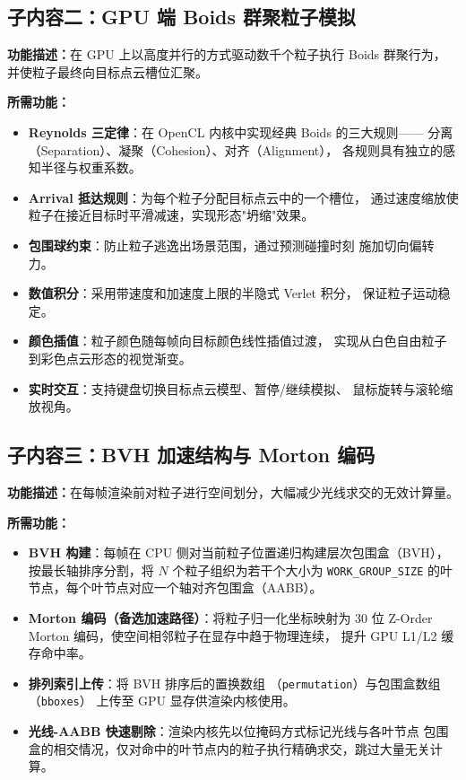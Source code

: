 \subsection{子内容二：GPU 端 Boids 群聚粒子模拟}

\textbf{功能描述：}在 GPU 上以高度并行的方式驱动数千个粒子执行 Boids 群聚行为，
并使粒子最终向目标点云槽位汇聚。

\textbf{所需功能：}
\begin{itemize}
  \item \textbf{Reynolds 三定律}：在 OpenCL 内核中实现经典 Boids 的三大规则——
        分离（Separation）、凝聚（Cohesion）、对齐（Alignment），
        各规则具有独立的感知半径与权重系数。
  \item \textbf{Arrival 抵达规则}：为每个粒子分配目标点云中的一个槽位，
        通过速度缩放使粒子在接近目标时平滑减速，实现形态"坍缩"效果。
  \item \textbf{包围球约束}：防止粒子逃逸出场景范围，通过预测碰撞时刻
        施加切向偏转力。
  \item \textbf{数值积分}：采用带速度和加速度上限的半隐式 Verlet 积分，
        保证粒子运动稳定。
  \item \textbf{颜色插值}：粒子颜色随每帧向目标颜色线性插值过渡，
        实现从白色自由粒子到彩色点云形态的视觉渐变。
  \item \textbf{实时交互}：支持键盘切换目标点云模型、暂停/继续模拟、
        鼠标旋转与滚轮缩放视角。
\end{itemize}

\subsection{子内容三：BVH 加速结构与 Morton 编码}

\textbf{功能描述：}在每帧渲染前对粒子进行空间划分，大幅减少光线求交的无效计算量。

\textbf{所需功能：}
\begin{itemize}
  \item \textbf{BVH 构建}：每帧在 CPU 侧对当前粒子位置递归构建层次包围盒（BVH），
        按最长轴排序分割，将 $N$ 个粒子组织为若干个大小为 \texttt{WORK\_GROUP\_SIZE}
        的叶节点，每个叶节点对应一个轴对齐包围盒（AABB）。
  \item \textbf{Morton 编码（备选加速路径）}：将粒子归一化坐标映射为
        30 位 Z-Order Morton 编码，使空间相邻粒子在显存中趋于物理连续，
        提升 GPU L1/L2 缓存命中率。
  \item \textbf{排列索引上传}：将 BVH 排序后的置换数组
        （\texttt{permutation}）与包围盒数组（\texttt{bboxes}）
        上传至 GPU 显存供渲染内核使用。
  \item \textbf{光线-AABB 快速剔除}：渲染内核先以位掩码方式标记光线与各叶节点
        包围盒的相交情况，仅对命中的叶节点内的粒子执行精确求交，跳过大量无关计算。
\end{itemize}

